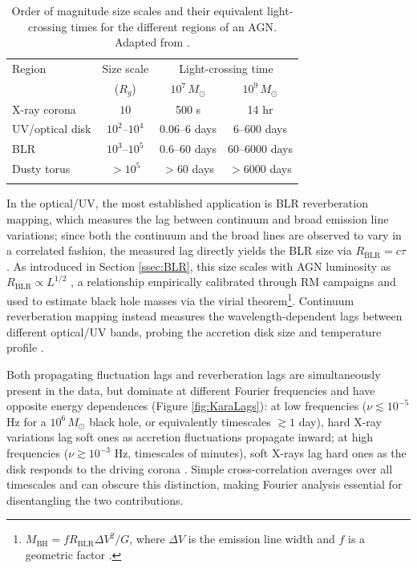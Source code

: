 \begin{table}[H]
\centering
\caption[AGN region size scales and variability timescales]{\label{tab:timescales} Order of magnitude size scales and their equivalent light-crossing times for the different regions of an AGN. Adapted from \cite{Cackett2021RMFiguresGOOD}.}
\begin{tabular}{lccc}
\hline%
\noalign{\smallskip}
Region & Size scale & \multicolumn{2}{c}{Light-crossing time} \\
\noalign{\smallskip}
& ($R_g$) & $10^7\,M_\odot$ & $10^9\,M_\odot$ \\
\noalign{\smallskip}
\hline
\noalign{\smallskip}
X-ray corona    & $10$              & 500 s        & 14 hr        \\
UV/optical disk & $10^2$--$10^4$   & 0.06--6 days & 6--600 days  \\
BLR             & $10^3$--$10^5$   & 0.6--60 days & 60--6000 days\\
Dusty torus     & $>10^5$          & $>$60 days   & $>$6000 days \\
\noalign{\smallskip}
\hline
\end{tabular}
\end{table}

In the optical/UV, the most established application is BLR reverberation mapping, which measures the lag between continuum and broad emission line variations; since both the continuum and the broad lines are observed to vary in a correlated fashion, the measured lag directly yields the BLR size via $R_\mathrm{BLR} = c\tau$ \parencite{Peterson2006BLR}. As introduced in Section \ref{ssec:BLR}, this size scales with AGN luminosity as $R_\mathrm{BLR} \propto L^{1/2}$ \parencite{Kaspi2000BLRSScalingL}, a relationship empirically calibrated through RM campaigns and used to estimate black hole masses via the virial theorem\footnote{$M_\mathrm{BH} = f R_\mathrm{BLR} \Delta V^2 / G$, where $\Delta V$ is the emission line width and $f$ is a geometric factor \parencite{Peterson2006BLR}.}. Continuum reverberation mapping instead measures the wavelength-dependent lags between different optical/UV bands, probing the accretion disk size and temperature profile \parencite{Cackett2021RMFiguresGOOD}.

Both propagating fluctuation lags and reverberation lags are simultaneously present in the data, but dominate at different Fourier frequencies and have opposite energy dependences (Figure \ref{fig:KaraLags}): at low frequencies ($\nu \lesssim 10^{-5}$ Hz for a $10^6\,M_\odot$ black hole, or equivalently timescales $\gtrsim 1$ day), hard X-ray variations lag soft ones as accretion fluctuations propagate inward; at high frequencies ($\nu \gtrsim 10^{-3}$ Hz, timescales of minutes), soft X-rays lag hard ones as the disk responds to the driving corona \parencite{Kara2025SMBHXRayReview}. Simple cross-correlation averages over all timescales and can obscure this distinction, making Fourier analysis essential for disentangling the two contributions.

